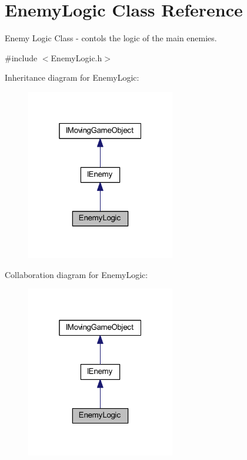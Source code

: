 \hypertarget{class_enemy_logic}{}\section{Enemy\+Logic Class Reference}
\label{class_enemy_logic}


Enemy Logic Class -\/ contols the logic of the main enemies.  




{\ttfamily \#include $<$Enemy\+Logic.\+h$>$}



Inheritance diagram for Enemy\+Logic\+:\nopagebreak
\begin{figure}[H]
\begin{center}
\leavevmode
\includegraphics[width=184pt]{class_enemy_logic__inherit__graph}
\end{center}
\end{figure}


Collaboration diagram for Enemy\+Logic\+:\nopagebreak
\begin{figure}[H]
\begin{center}
\leavevmode
\includegraphics[width=184pt]{class_enemy_logic__coll__graph}
\end{center}
\end{figure}
